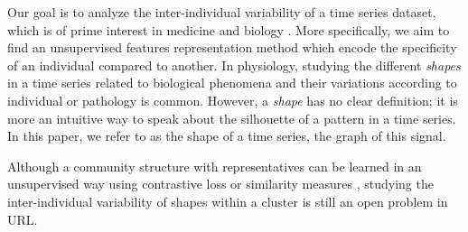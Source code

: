  Our goal is to analyze the inter-individual variability of a time series dataset, which is of prime interest in medicine and biology \cite{wang2016research,bar2012studying,germain2023unsupervised}.
  More specifically, we aim to find an unsupervised features representation method which encode the specificity of an individual compared to another. 
  In physiology, studying the different \textit{shapes} in a time series related to biological phenomena and their variations according to individual or pathology is common.
  However, a \textit{shape} has no clear definition; it is more an intuitive way to speak about the silhouette of a pattern in a time series. In this paper, we refer to as the shape of a time series, the graph of this signal.

  Although a community structure with representatives can be learned in an unsupervised way \cite{trirat2024universal,meng2023unsupervised} using contrastive loss \cite{franceschi2019unsupervised,tonekaboni2021unsupervised,meng2023unsupervised}
  or similarity measures \cite{asgari2023clustering,germain2023unsupervised,paparrizos2015k,ye2009time},
     studying the inter-individual variability of shapes within a cluster \cite{niennattrakul2007inaccuracies,shirato2023identifying} is still an open problem in URL.


